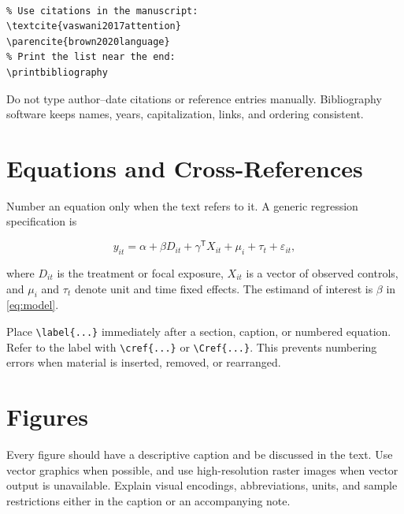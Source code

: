 \documentclass{templates/aidealabs-paper}
\begin{document}
\begin{Verbatim}[fontsize=\small]

% Use citations in the manuscript:
\textcite{vaswani2017attention}
\parencite{brown2020language}
% Print the list near the end:
\printbibliography
\end{Verbatim}

Do not type author--date citations or reference entries manually. Bibliography software keeps names, years, capitalization, links, and ordering consistent.

\section{Equations and Cross-References}
\label{sec:equations}

Number an equation only when the text refers to it. A generic regression specification is

\begin{equation}
  y_{it} = \alpha + \beta D_{it} + \gamma^{\mathsf{T}} X_{it}
  + \mu_i + \tau_t + \varepsilon_{it},
  \label{eq:model}
\end{equation}

where $D_{it}$ is the treatment or focal exposure, $X_{it}$ is a vector of observed controls, and $\mu_i$ and $\tau_t$ denote unit and time fixed effects. The estimand of interest is $\beta$ in \cref{eq:model}.

Place \verb|\label{...}| immediately after a section, caption, or numbered equation. Refer to the label with \verb|\cref{...}| or \verb|\Cref{...}|. This prevents numbering errors when material is inserted, removed, or rearranged.

\section{Figures}
\label{sec:figures}

Every figure should have a descriptive caption and be discussed in the text. Use vector graphics when possible, and use high-resolution raster images when vector output is unavailable. Explain visual encodings, abbreviations, units, and sample restrictions either in the caption or an accompanying note.
\end{document}
